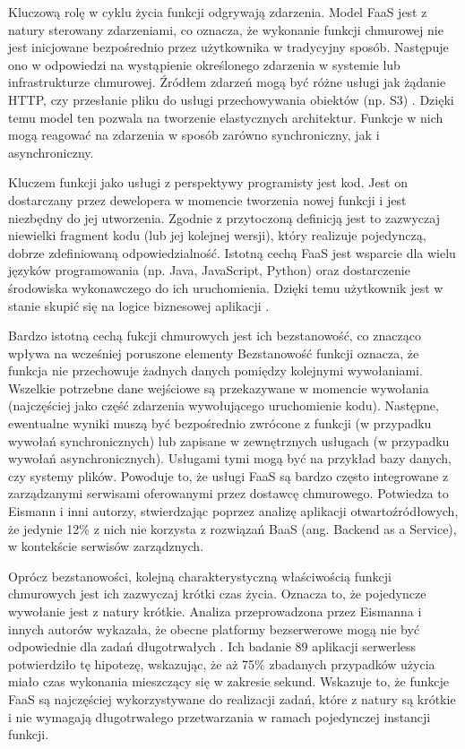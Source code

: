 Kluczową rolę w cyklu życia funkcji odgrywają zdarzenia.
Model FaaS jest z natury sterowany zdarzeniami, co oznacza, że wykonanie funkcji chmurowej nie jest inicjowane bezpośrednio przez użytkownika w tradycyjny sposób.
Następuje ono w odpowiedzi na wystąpienie określonego zdarzenia w systemie lub infrastrukturze chmurowej.
Źródłem zdarzeń mogą być różne usługi jak żądanie HTTP, czy przesłanie pliku do usługi przechowywania obiektów (np. S3) \cite{awsLambdaDocs}.
Dzięki temu model ten pozwala na tworzenie elastycznych architektur.
Funkcje w nich mogą reagować na zdarzenia w sposób zarówno synchroniczny, jak i asynchroniczny.

Kluczem funkcji jako usługi z perspektywy programisty jest kod.
Jest on dostarczany przez dewelopera w momencie tworzenia nowej funkcji i jest niezbędny do jej utworzenia.
Zgodnie z przytoczoną definicją jest to zazwyczaj niewielki fragment kodu (lub jej kolejnej wersji), który realizuje pojedynczą, dobrze zdefiniowaną odpowiedzialność.
Istotną cechą FaaS jest wsparcie dla wielu języków programowania (np. Java, JavaScript, Python) oraz dostarczenie środowiska wykonawczego do ich uruchomienia.
Dzięki temu użytkownik jest w stanie skupić się na logice biznesowej aplikacji \cite{ServerlessApplicationsWhyWhenAndHow}.

Bardzo istotną cechą fukcji chmurowych jest ich bezstanowość, co znacząco wpływa na wcześniej poruszone elementy 
Bezstanowość funkcji oznacza, że funkcja nie przechowuje żadnych danych pomiędzy kolejnymi wywołaniami.
Wszelkie potrzebne dane wejściowe są przekazywane w momencie wywołania (najczęściej jako część zdarzenia wywołującego uruchomienie kodu).
Następne, ewentualne wyniki muszą być bezpośrednio zwrócone z funkcji (w przypadku wywołań synchronicznych) lub zapisane w zewnętrznych usługach (w przypadku wywołań asynchronicznych).
Usługami tymi mogą być na przykład bazy danych, czy systemy plików. 
Powoduje to, że usługi FaaS są bardzo często integrowane z zarządzanymi serwisami oferowanymi przez dostawcę chmurowego.
Potwiedza to Eismann i inni autorzy, stwierdzając poprzez analizę aplikacji otwartoźródłowych, że jedynie 12\% z nich nie korzysta z rozwiązań BaaS (ang. Backend as a Service), w kontekście serwisów zarządznych.

Oprócz bezstanowości, kolejną charakterystyczną właściwością funkcji chmurowych jest ich zazwyczaj krótki czas życia.
Oznacza to, że pojedyncze wywołanie jest z natury krótkie.
Analiza przeprowadzona przez Eismanna i innych autorów wykazała, że obecne platformy bezserwerowe mogą nie być odpowiednie dla zadań długotrwałych \cite{ServerlessApplicationsWhyWhenAndHow}. 
Ich badanie 89 aplikacji serwerless potwierdziło tę hipotezę, wskazując, że aż 75\% zbadanych przypadków użycia miało czas wykonania mieszczący się w zakresie sekund. 
Wskazuje to, że funkcje FaaS są najczęściej wykorzystywane do realizacji zadań, które z natury są krótkie i nie wymagają długotrwałego przetwarzania w ramach pojedynczej instancji funkcji.

